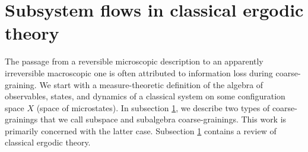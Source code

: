 \documentclass[a4paper,11pt]{article}
\theoremstyle{definition}
\begin{document}




\section{Subsystem flows in classical ergodic theory}


The passage from a reversible microscopic description to an apparently irreversible macroscopic one is often attributed to information loss during coarse-graining. We start with a measure-theoretic definition of the algebra of observables, states, and dynamics of a classical system on some configuration space $X$ (space of microstates). In subsection \ref{}, we describe two types of coarse-grainings that we call subspace and subalgebra coarse-grainings. This work is primarily concerned with the latter case. Subsection \ref{} contains a review of classical ergodic theory.
\end{document}
